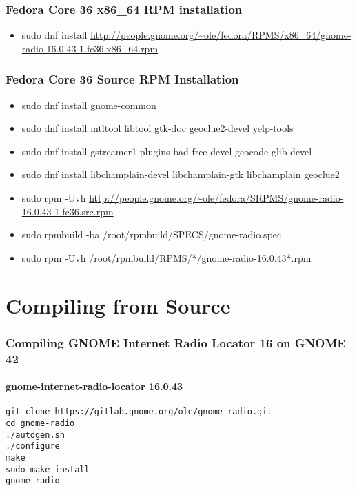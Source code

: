 \documentclass[aspectratio=43]{beamer}
\begin{document}
\begin{frame}
\frametitle{Fedora Core 36 x86\_64 RPM installation}

    \begin{itemize}
        \item sudo dnf install \url{http://people.gnome.org/~ole/fedora/RPMS/x86\_64/gnome-radio-16.0.43-1.fc36.x86\_64.rpm}
    \end{itemize}

\end{frame}

\begin{frame}
\frametitle{Fedora Core 36 Source RPM Installation}

\begin{itemize}
        \item sudo dnf install gnome-common
        \item sudo dnf install intltool libtool gtk-doc geoclue2-devel yelp-tools
        \item sudo dnf install gstreamer1-plugins-bad-free-devel geocode-glib-devel
        \item sudo dnf install libchamplain-devel libchamplain-gtk libchamplain geoclue2
        \item sudo rpm -Uvh \url{http://people.gnome.org/~ole/fedora/SRPMS/gnome-radio-16.0.43-1.fc36.src.rpm}
        \item sudo rpmbuild -ba /root/rpmbuild/SPECS/gnome-radio.spec
        \item sudo rpm -Uvh /root/rpmbuild/RPMS/*/gnome-radio-16.0.43*.rpm
\end{itemize}
    
\end{frame}


\section{Compiling from Source}

\begin{frame}
\frametitle{Compiling GNOME Internet Radio Locator 16 on GNOME 42}
\framesubtitle{gnome-internet-radio-locator 16.0.43}

    \texttt{git clone https://gitlab.gnome.org/ole/gnome-radio.git\\
cd gnome-radio\\
./autogen.sh\\
./configure\\
make\\
sudo make install\\
gnome-radio}
\end{frame}
\end{document}
